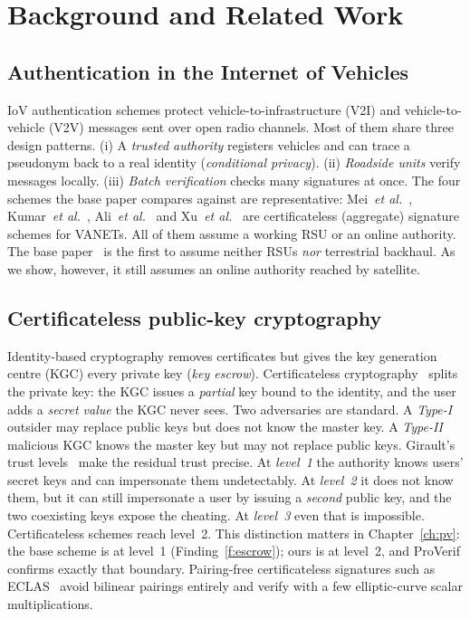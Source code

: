 \chapter{Background and Related Work}\label{ch:background}

\section{Authentication in the Internet of Vehicles}
IoV authentication schemes protect vehicle-to-infrastructure (V2I) and vehicle-to-vehicle (V2V) messages sent over open radio channels. Most of them
share three design patterns. (i) A \emph{trusted authority} registers vehicles and can trace a pseudonym back to a real identity
(\emph{conditional privacy}). (ii) \emph{Roadside units} verify messages locally. (iii) \emph{Batch verification} checks many signatures at once.
The four schemes the base paper compares against are representative: Mei~\textit{et al.}~\cite{mei}, Kumar~\textit{et al.}~\cite{kumar},
Ali~\textit{et al.}~\cite{ali} and Xu~\textit{et al.}~\cite{xu} are certificateless (aggregate) signature schemes for VANETs. All of them assume a working
RSU or an online authority. The base paper~\cite{base} is the first to assume neither RSUs \emph{nor} terrestrial backhaul. As we show, however, it still
assumes an online authority reached by satellite.

\section{Certificateless public-key cryptography}
Identity-based cryptography removes certificates but gives the key generation centre (KGC) every private key (\emph{key escrow}). Certificateless
cryptography~\cite{alriyami} splits the private key: the KGC issues a \emph{partial} key bound to the identity, and the user adds a \emph{secret value}
the KGC never sees. Two adversaries are standard. A \emph{Type-I} outsider may replace public keys but does not know the master key. A \emph{Type-II}
malicious KGC knows the master key but may not replace public keys. Girault's trust levels~\cite{girault} make the residual trust precise. At
\emph{level~1} the authority knows users' secret keys and can impersonate them undetectably. At \emph{level~2} it does not know them, but it can still
impersonate a user by issuing a \emph{second} public key, and the two coexisting keys expose the cheating. At \emph{level~3} even that is impossible.
Certificateless schemes reach level~2. This distinction matters in Chapter~\ref{ch:pv}: the base scheme is at level~1 (Finding~\ref{f:escrow}); ours is at
level~2, and ProVerif confirms exactly that boundary. Pairing-free certificateless signatures such as ECLAS~\cite{eclas} avoid bilinear pairings entirely
and verify with a few elliptic-curve scalar multiplications.

